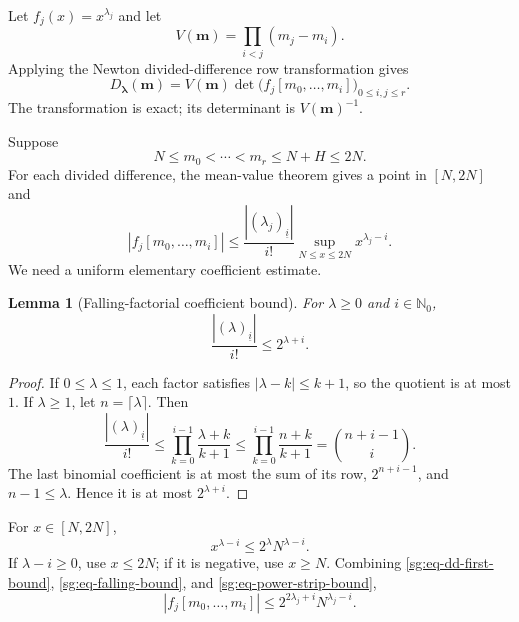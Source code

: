 \documentclass[11pt,oneside]{article}
\newtheorem{lemma}[theorem]{Lemma}
\theoremstyle{definition}
\theoremstyle{remark}
\newcommand{\Nzero}{\mathbb N_0}
\newcommand{\fall}[2]{\left(#1\right)_{\!\underline{#2}}}
\begin{document}
Let $f_j(x)=x^{\lambda_j}$ and let
\[
 V(\boldsymbol m)=\prod_{i<j}(m_j-m_i).
\]
Applying the Newton divided-difference row transformation gives
\begin{equation}
 D_{\boldsymbol\lambda}(\boldsymbol m)
 =V(\boldsymbol m)
  \det\bigl(f_j[m_0,\ldots,m_i]\bigr)_{0\le i,j\le r}.
 \label{sg:eq-newton-factorization}
\end{equation}
The transformation is exact; its determinant is $V(\boldsymbol m)^{-1}$.

Suppose
\[
 N\le m_0<\cdots<m_r\le N+H\le2N.
\]
For each divided difference, the mean-value theorem gives a point in $[N,2N]$ and
\begin{equation}
 |f_j[m_0,\ldots,m_i]|
 \le
 \frac{|\fall{\lambda_j}{i}|}{i!}
 \sup_{N\le x\le2N}x^{\lambda_j-i}.
 \label{sg:eq-dd-first-bound}
\end{equation}
We need a uniform elementary coefficient estimate.

\begin{lemma}[Falling-factorial coefficient bound]
\label{sg:lem-falling-bound}
For $\lambda\ge0$ and $i\in\Nzero$,
\begin{equation}
 \frac{|\fall{\lambda}{i}|}{i!}\le2^{\lambda+i}.
 \label{sg:eq-falling-bound}
\end{equation}
\end{lemma}

\begin{proof}
If $0\le\lambda\le1$, each factor satisfies
$|\lambda-k|\le k+1$, so the quotient is at most $1$.
If $\lambda\ge1$, let $n=\lceil\lambda\rceil$.  Then
\[
 \frac{|\fall{\lambda}{i}|}{i!}
 \le\prod_{k=0}^{i-1}\frac{\lambda+k}{k+1}
 \le\prod_{k=0}^{i-1}\frac{n+k}{k+1}
 =\binom{n+i-1}{i}.
\]
The last binomial coefficient is at most the sum of its row,
$2^{n+i-1}$, and $n-1\le\lambda$.  Hence it is at most $2^{\lambda+i}$.
\end{proof}

For $x\in[N,2N]$,
\begin{equation}
 x^{\lambda-i}\le2^\lambda N^{\lambda-i}.
 \label{sg:eq-power-strip-bound}
\end{equation}
If $\lambda-i\ge0$, use $x\le2N$; if it is negative, use $x\ge N$.
Combining \eqref{sg:eq-dd-first-bound}, \eqref{sg:eq-falling-bound}, and
\eqref{sg:eq-power-strip-bound},
\begin{equation}
 |f_j[m_0,\ldots,m_i]|
 \le2^{2\lambda_j+i}N^{\lambda_j-i}.
 \label{sg:eq-dd-final-bound}
\end{equation}
\end{document}
